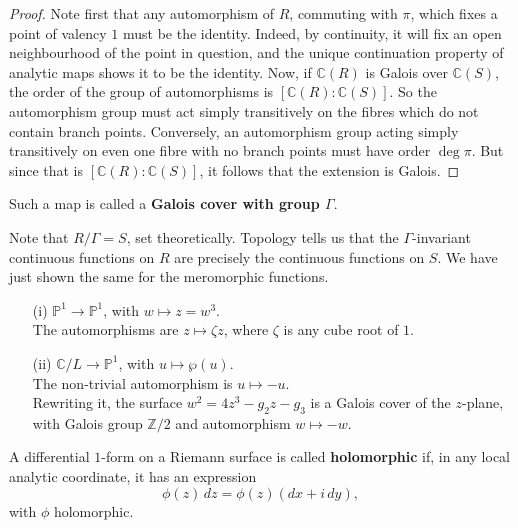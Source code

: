 \documentclass[12pt]{article}
\begin{document}
\begin{proof}
Note first that any automorphism of $R$, commuting with $\pi$, which fixes a point of valency $1$ must be the identity.  
Indeed, by continuity, it will fix an open neighbourhood of the point in question, and the unique continuation property of analytic maps shows it to be the identity.  
Now, if $\mathbb{C}(R)$ is Galois over $\mathbb{C}(S)$, the order of the group of automorphisms is $[\mathbb{C}(R):\mathbb{C}(S)]$.  
So the automorphism group must act simply transitively on the fibres which do not contain branch points.  
Conversely, an automorphism group acting simply transitively on even one fibre with no branch points must have order $\deg \pi$.  
But since that is $[\mathbb{C}(R):\mathbb{C}(S)]$, it follows that the extension is Galois.
\end{proof}

\begin{remark}
Such a map is called a \textbf{Galois cover with group $\Gamma$}.
\end{remark}

\begin{remark}
Note that $R/\Gamma = S$, set theoretically.  
Topology tells us that the $\Gamma$-invariant continuous functions on $R$ are precisely the continuous functions on $S$.  
We have just shown the same for the meromorphic functions.
\end{remark}

\begin{example}
    \leavevmode
\begin{enumerate}
    \item[(i)] $\mathbb{P}^1 \longrightarrow \mathbb{P}^1$, with $w \longmapsto z = w^3$.\\[4pt]
    The automorphisms are $z \mapsto \zeta z$, where $\zeta$ is any cube root of $1$.

    \item[(ii)] $\mathbb{C}/L \longrightarrow \mathbb{P}^1$, with $u \longmapsto \wp(u)$.\\[4pt]
    The non-trivial automorphism is $u \longmapsto -u$.\\[4pt]
    Rewriting it, the surface $w^2 = 4z^3 - g_2 z - g_3$ is a Galois cover of the $z$-plane, with Galois group $\mathbb{Z}/2$ and automorphism $w \mapsto -w$.
\end{enumerate}
\end{example}

\begin{definition}
A differential $1$-form on a Riemann surface is called \textbf{holomorphic} if, in any local analytic coordinate, it has an expression
\[
\phi(z)\,dz = \phi(z)(dx + i\,dy),
\]
with $\phi$ holomorphic.
\end{definition}
\end{document}
